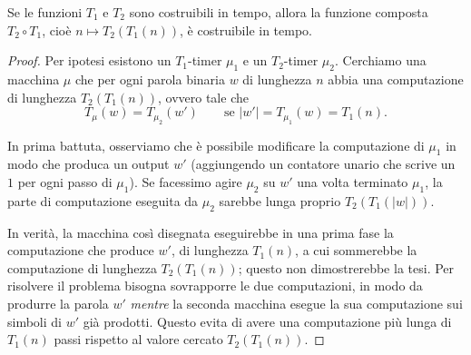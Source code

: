 \begin{prop}
Se le funzioni $T_1$ e $T_2$ sono costruibili in tempo, allora la funzione composta $T_2\circ T_1$, cioè $n\mapsto T_2(T_1(n))$, è costruibile in tempo.
\end{prop}

\begin{proof}
Per ipotesi esistono un $T_1$-timer $\mu_1$ e un $T_2$-timer $\mu_2$. Cerchiamo una macchina $\mu$ che per ogni parola binaria $w$ di lunghezza $n$ abbia una computazione di lunghezza $T_2(T_1(n))$, ovvero tale che
\[
T_\mu(w)=T_{\mu_2}(w')\qquad\text{se } |w'|=T_{\mu_1}(w)=T_1(n).
\]

In prima battuta, osserviamo che è possibile modificare la computazione di $\mu_1$ in modo che produca un output $w'$ (aggiungendo un contatore unario che scrive un $1$ per ogni passo di $\mu_1$). Se facessimo agire $\mu_2$ su $w'$ una volta terminato $\mu_1$, la parte di computazione eseguita da $\mu_2$ sarebbe lunga proprio $T_2(T_1(|w|))$.

In verità, la macchina così disegnata eseguirebbe in una prima fase la computazione che produce $w'$, di lunghezza $T_1(n)$, a cui sommerebbe la computazione di lunghezza $T_2(T_1(n))$; questo non dimostrerebbe la tesi. Per risolvere il problema bisogna sovrapporre le due computazioni, in modo da produrre la parola $w'$ \emph{mentre} la seconda macchina esegue la sua computazione sui simboli di $w'$ già prodotti. Questo evita di avere una computazione più lunga di $T_1(n)$ passi rispetto al valore cercato $T_2(T_1(n))$.


\end{proof}
